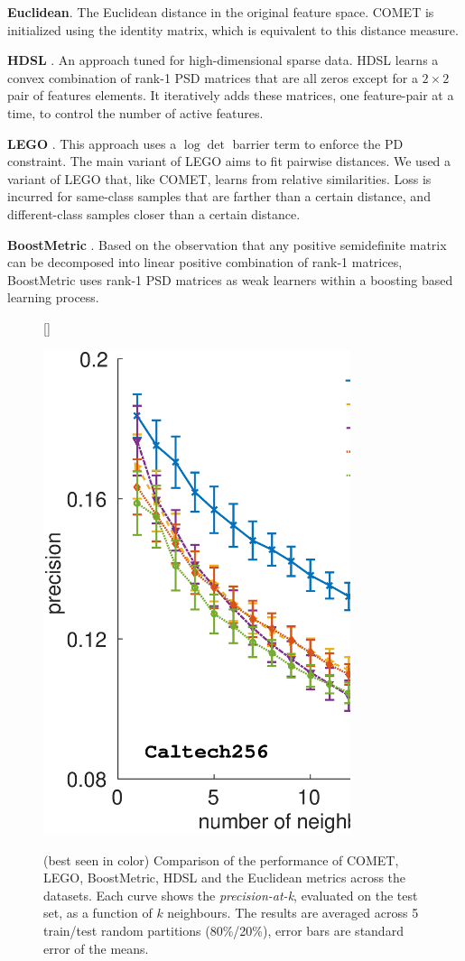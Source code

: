 \documentclass{article} %
\begin{document}
\textbf{Euclidean}. The Euclidean distance in the original feature space. COMET is initialized using the identity matrix, which is equivalent to this distance measure.

\textbf{HDSL} \cite{hdsl}. An approach tuned for high-dimensional sparse data. HDSL learns a convex combination of rank-1 PSD matrices that are all zeros except for a $2\times2$ pair of features elements. It iteratively adds these matrices, one feature-pair at a time, to control the number of active features.

\textbf{LEGO} \cite{lego}. This approach uses a $\log \det$ barrier term to enforce the PD constraint. The main variant of LEGO aims to fit pairwise distances. We used a variant of LEGO that, like COMET, learns from relative similarities. Loss is incurred for same-class samples that are farther than a certain distance, and different-class samples closer than a certain distance.

\textbf{BoostMetric} \cite{boost}. Based on the observation that any positive semidefinite matrix can be decomposed into linear positive combination of rank-1 matrices, BoostMetric uses rank-1 PSD matrices as weak learners within a boosting based learning process.
\begin{figure}[h]
[\FBwidth]
{\caption{(best seen in color) Comparison of the performance of COMET, LEGO, BoostMetric, HDSL and the Euclidean metrics across the datasets. Each curve shows the \textit{precision-at-k}, evaluated on the test set, as a function of $k$ neighbours. The results are averaged across 5 train/test random partitions (80\%/20\%), error bars are standard error of the means.}\label{precFig}}
{\includegraphics[width=9cm]{Precision_at_K_all_datasets_NIPS}}
\end{figure}
\end{document}
